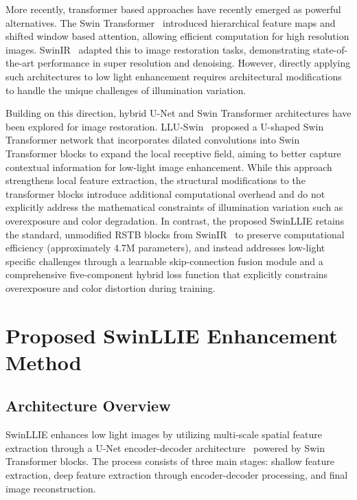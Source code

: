\documentclass[conference]{IEEEtran}
\begin{document}
More recently, transformer based approaches have recently emerged as powerful alternatives. The Swin Transformer~\cite{liu2021swin} introduced hierarchical feature maps and shifted window based attention, allowing efficient computation for high resolution images. SwinIR~\cite{liang2021swinir} adapted this to image restoration tasks, demonstrating state-of-the-art performance in super resolution and denoising. However, directly applying such architectures to low light enhancement requires architectural modifications to handle the unique challenges of illumination variation.

Building on this direction, hybrid U-Net and Swin Transformer architectures have been explored for image restoration. LLU-Swin~\cite{shao2022lluswin} proposed a U-shaped Swin Transformer network that incorporates dilated convolutions into Swin Transformer blocks to expand the local receptive field, aiming to better capture contextual information for low-light image enhancement. While this approach strengthens local feature extraction, the structural modifications to the transformer blocks introduce additional computational overhead and do not explicitly address the mathematical constraints of illumination variation such as overexposure and color degradation. In contrast, the proposed SwinLLIE retains the standard, unmodified RSTB blocks from SwinIR~\cite{liang2021swinir} to preserve computational efficiency (approximately 4.7M parameters), and instead addresses low-light specific challenges through a learnable skip-connection fusion module and a comprehensive five-component hybrid loss function that explicitly constrains overexposure and color distortion during training.

\section{Proposed SwinLLIE Enhancement Method}

\subsection{Architecture Overview}

SwinLLIE enhances low light images by utilizing multi-scale spatial feature extraction through a U-Net encoder-decoder architecture~\cite{ronneberger2015unet} powered by Swin Transformer blocks. The process consists of three main stages: shallow feature extraction, deep feature extraction through encoder-decoder processing, and final image reconstruction.
\end{document}
